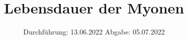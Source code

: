 
\usepackage{wrapfig}

\subject{Versuch Nr.V01}
\title{Lebensdauer der Myonen}
\date{%
  Durchführung: 13.06.2022
  \hspace{3em}
  Abgabe: 05.07.2022
}



\maketitle
\thispagestyle{empty}
\newpage 







\nocite{*}

\printbibliography{}


